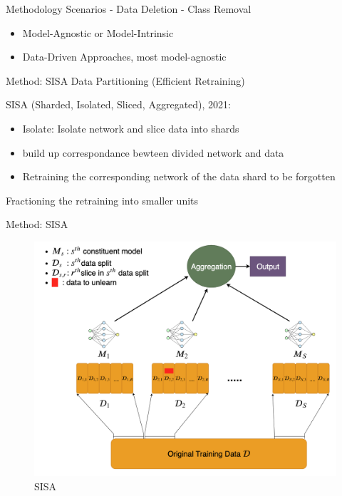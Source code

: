 \documentclass[
  ignorenonframetext,
  aspectratio=169,
]{beamer}
\providecommand{\tightlist}{%
  \setlength{\itemsep}{0pt}\setlength{\parskip}{0pt}}\usepackage{longtable,booktabs,array}
\begin{document}
\begin{frame}{Methodology}
\label{methodology}
Scenarios - Data Deletion - Class Removal

\begin{itemize}
\tightlist
\item
  Model-Agnostic or Model-Intrinsic
\item
  Data-Driven Approaches, most model-agnostic
\end{itemize}
\end{frame}

\begin{frame}{Method: SISA}
\label{method-sisa}
Data Partitioning (Efficient Retraining)

SISA (Sharded, Isolated, Sliced, Aggregated), 2021:

\begin{itemize}
\tightlist
\item
  Isolate: Isolate network and slice data into shards
\item
  build up correspondance bewteen divided network and data
\item
  Retraining the corresponding network of the data shard to be forgotten
\end{itemize}

Fractioning the retraining into smaller units
\end{frame}

\begin{frame}{Method: SISA}
\label{method-sisa-1}
\begin{figure}[H]

{\centering \includegraphics{assets/SISA.png}

}

\caption{SISA}

\end{figure}%
\end{frame}
\end{document}
